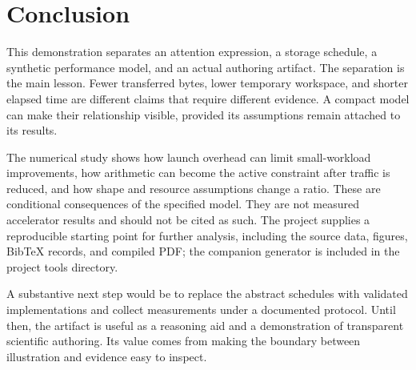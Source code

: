 \section{Conclusion}
\label{sec:conclusion}
This demonstration separates an attention expression, a storage schedule, a synthetic performance model, and an actual authoring artifact. The separation is the main lesson. Fewer transferred bytes, lower temporary workspace, and shorter elapsed time are different claims that require different evidence. A compact model can make their relationship visible, provided its assumptions remain attached to its results.

The numerical study shows how launch overhead can limit small-workload improvements, how arithmetic can become the active constraint after traffic is reduced, and how shape and resource assumptions change a ratio. These are conditional consequences of the specified model. They are not measured accelerator results and should not be cited as such. The project supplies a reproducible starting point for further analysis, including the source data, figures, BibTeX records, and compiled PDF; the companion generator is included in the project tools directory.

A substantive next step would be to replace the abstract schedules with validated implementations and collect measurements under a documented protocol. Until then, the artifact is useful as a reasoning aid and a demonstration of transparent scientific authoring. Its value comes from making the boundary between illustration and evidence easy to inspect.
